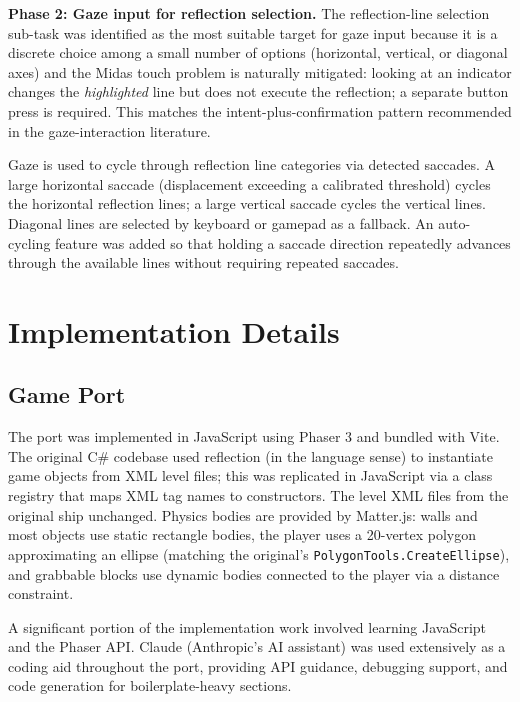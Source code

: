 \documentclass[11pt,twocolumn]{article}
\begin{document}
\textbf{Phase 2: Gaze input for reflection selection.} The reflection-line
selection sub-task was identified as the most suitable target for gaze input
because it is a discrete choice among a small number of options (horizontal,
vertical, or diagonal axes) and the Midas touch problem is naturally mitigated:
looking at an indicator changes the \emph{highlighted} line but does not
execute the reflection; a separate button press is required. This matches the
intent-plus-confirmation pattern recommended in the gaze-interaction literature.

Gaze is used to cycle through reflection line categories via detected saccades.
A large horizontal saccade (displacement exceeding a calibrated threshold)
cycles the horizontal reflection lines; a large vertical saccade cycles the
vertical lines. Diagonal lines are selected by keyboard or gamepad as a
fallback. An auto-cycling feature was added so that holding a saccade direction
repeatedly advances through the available lines without requiring repeated
saccades.

\section{Implementation Details}

\subsection{Game Port}

The port was implemented in JavaScript using Phaser 3 and bundled with Vite.
The original C\# codebase used reflection (in the language sense) to
instantiate game objects from XML level files; this was replicated in JavaScript
via a class registry that maps XML tag names to constructors. The level XML
files from the original ship unchanged. Physics bodies are provided by
Matter.js: walls and most objects use static rectangle bodies, the player uses
a 20-vertex polygon approximating an ellipse (matching the original's
\texttt{PolygonTools.CreateEllipse}), and grabbable blocks use dynamic bodies
connected to the player via a distance constraint.

A significant portion of the implementation work involved learning JavaScript
and the Phaser API. Claude (Anthropic's AI assistant) was used extensively as a
coding aid throughout the port, providing API guidance, debugging support, and
code generation for boilerplate-heavy sections.
\end{document}
